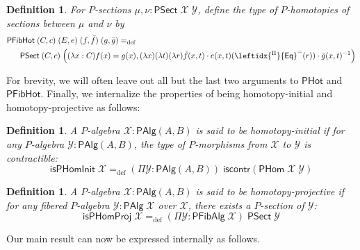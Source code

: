 \documentclass[10pt,a4paper,oneside,reqno]{amsart}
\numberwithin{equation}{section}
\theoremstyle{mythm}
\theoremstyle{mydef}
\newtheorem{definition}[theorem]{Definition}
\theoremstyle{myrmk}
\newcommand{\defeq}{=_{\mathrm{def}}}
\newcommand{\iscontr}{\mathsf{iscontr}}
\newcommand{\ct}{\cdot}
\newcommand{\funext}{\leftidx{^\Pi}{\mathsf{Eq}}^{=}}
\newcommand{\WCell}{\mathsf{PHot}}
\newcommand{\WFibCell}{\mathsf{PFibHot}}
\newcommand{\WAlg}{\mathsf{PAlg}}
\newcommand{\WFibAlg}{\mathsf{PFibAlg}}
\newcommand{\WHom}{\mathsf{PHom}}
\newcommand{\WFibHom}{\mathsf{PSect}}
\newcommand{\IsWHInit}{\mathsf{isPHomInit}}
\newcommand{\IsWHProj}{\mathsf{isPHomProj}}
\newcommand{\X}{\mathcal{X}}
\newcommand{\Y}{\mathcal{Y}}
\begin{document}
\begin{definition}\label{def:WFibCell}
For $P$-sections $\mu, \nu : \WFibHom \; \X \; \Y$, define the type of \emph{$P$-homotopies of sections} between $\mu$ and $\nu$ by
\begin{align*}
& \WFibCell \; (C,c) \; (E, e) \; (f,\bar{f}) \; (g,\bar{g}) \defeq \\ & \;\;\; \;\;\;\WFibHom \; (C,c) \; \Big((\lambda x:C) f(x) = g(x), (\lambda x) (\lambda t) (\lambda r) \bar{f}(x,t) \ct e(x,t)(\funext(r)) \ct \bar{g}(x,t)^{-1}\Big)
\end{align*}
\end{definition}

For brevity, we will often leave out all but the last two arguments to $\WCell$ and $\WFibCell$. Finally, we internalize the properties of being homotopy-initial and homotopy-projective as follows:

\begin{definition}\label{def:WHInit}
A $P$-algebra $\X : \WAlg(A,B)$ is said to be \emph{homotopy-initial} if for any $P$-algebra $\Y : \WAlg(A,B)$, the type of $P$-morphisms from $\X$ to $\Y$ is contractible:
\[ \IsWHInit \; \X \defeq (\Pi \Y:\WAlg(A,B)) \; \iscontr(\WHom \; \X \; \Y) \]  
\end{definition}

\begin{definition}\label{def:WHProj}
A $P$-algebra $\X : \WAlg(A,B)$ is said to be \emph{homotopy-projective} if for any fibered $P$-algebra $\Y : \WAlg \; \X$ over $\X$, there exists a $P$-section of $\Y$:
\[ \IsWHProj \; \X \defeq (\Pi \Y:\WFibAlg \; \X) \; \WFibHom \; \Y \]  
\end{definition}

Our main result can now be expressed internally as follows.
\end{document}
